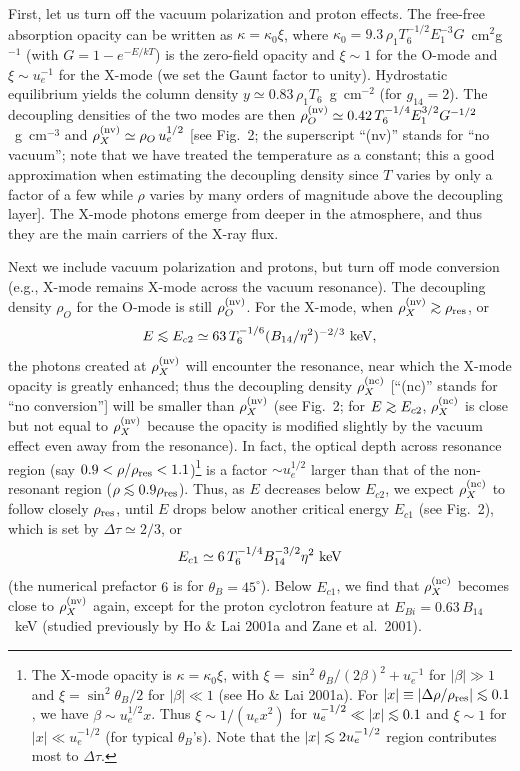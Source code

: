 \documentclass{aastex}
\def\be{\begin{equation}}
\def\ee{\end{equation}}
\def\go{\mathrel{\raise.3ex\hbox{$>$}\mkern-14mu
             \lower0.6ex\hbox{$\sim$}}}
\def\lo{\mathrel{\raise.3ex\hbox{$<$}\mkern-14mu
             \lower0.6ex\hbox{$\sim$}}}
\begin{document}
First, let us turn off the vacuum polarization and proton effects.
The free-free absorption opacity can be written as $\kappa=\kappa_0\xi$,
where $\kappa_0=9.3\,\rho_1T_6^{-1/2}E_1^{-3}G$~cm$^2$g$^{-1}$ (with
$G=1-e^{-E/kT}$) is the zero-field opacity and $\xi\sim 1$ for the O-mode
and $\xi\sim u_e^{-1}$ for the X-mode (we set the Gaunt factor to unity).
Hydrostatic equilibrium yields the column density $y\simeq 0.83\,\rho_1
T_6$~g~cm$^{-2}$ (for $g_{14}=2$).
The decoupling densities of the two modes are then
$\rho_O^{\rm (nv)}\simeq 0.42\,T_6^{-1/4}E_1^{3/2}G^{-1/2}$~g~cm$^{-3}$
and $\rho_X^{\rm (nv)}\simeq \rho_O\,u_e^{1/2}$
[see Fig.~2; the superscript ``(nv)'' stands for ``no vacuum'';
note that we have treated the temperature as a constant; this a good
approximation when estimating the decoupling density since $T$ varies
by only a factor of a few while $\rho$ varies by many orders of
magnitude above the decoupling layer]. The X-mode photons emerge
from deeper in the atmosphere, and thus they are the main carriers of 
the X-ray flux.

Next we include vacuum polarization and protons, but turn off
mode conversion (e.g., X-mode remains X-mode across the vacuum
resonance). The decoupling density $\rho_O$ for the O-mode
is still $\rho_O^{(\rm nv)}$. For the X-mode, when $\rho_X^{\rm (nv)}\go
\rho_{\rm res}$, or
\be
E\lo E_{c2}\simeq 63\,T_6^{-1/6}(B_{14}/\eta^2)^{-2/3}~{\rm keV},
\ee
the photons created at $\rho_X^{\rm (nv)}$ will encounter the resonance,
near which the X-mode opacity is greatly enhanced; thus the decoupling
density $\rho_X^{\rm (nc)}$ [``(nc)'' stands for ``no conversion'']
will be smaller than $\rho_X^{(\rm nv)}$ (see Fig.~2; 
for $E\go E_{c2}$, $\rho_X^{\rm (nc)}$
is close but not equal to $\rho_X^{\rm (nv)}$
because the opacity is modified slightly by the vacuum effect
even away from the resonance). In fact, the optical depth across
resonance region (say $0.9<\rho/\rho_{\rm res}<1.1$)\footnote{
The X-mode opacity is $\kappa=\kappa_0\xi$, with $\xi
=\sin^2\theta_B/(2\beta)^2+u_e^{-1}$ for $|\beta|\gg 1$ and
$\xi=\sin^2\theta_B/2$ for $|\beta|\ll 1$ (see Ho \& Lai 2001a).
For $|x|\equiv|\Delta\rho/\rho_{\rm res}|\lo 0.1$, 
we have $\beta\sim u_e^{1/2}x$. Thus $\xi\sim 1/(u_ex^2)$ 
for $u_e^{-1/2}\ll |x|\lo 0.1$ and $\xi\sim 1$ for $|x|\ll u_e^{-1/2}$ 
(for typical $\theta_B$'s).  Note that the $|x|\lo 2u_e^{-1/2}$ region 
contributes most to $\Delta\tau$.}
is a factor $\sim u_e^{1/2}$ larger than that of the non-resonant
region ($\rho\lo 0.9 \rho_{\rm res}$). Thus,
as $E$ decreases below $E_{c2}$, we expect $\rho_X^{\rm (nc)}$
to follow closely $\rho_{\rm res}$, until $E$ drops below another critical 
energy $E_{c1}$ (see Fig.~2), which is set by $\Delta\tau\simeq 2/3$, or
\be
E_{c1}\simeq 6\,T_6^{-1/4}B_{14}^{-3/2}\eta^2~{\rm keV}
\ee
(the numerical prefactor $6$ is for $\theta_B=45^\circ$).
Below $E_{c1}$, we find that $\rho_X^{\rm (nc)}$ becomes
close to $\rho_X^{(\rm nv)}$ again, except for the proton cyclotron feature at
$E_{Bi}=0.63\,B_{14}$~keV (studied previously by Ho \& Lai 2001a and Zane et
al.~2001).
\end{document}

